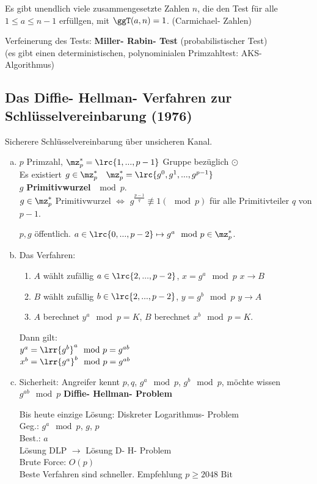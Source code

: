     Es gibt unendlich viele zusammengesetzte Zahlen $n$, die den Test für alle
    $1\leq a\leq n-1$ erfüllgen, mit $\ggT(a,n)=1$. (Carmichael- Zahlen)

    Verfeinerung des Tests: \textbf{Miller- Rabin- Test} (probabilistischer
    Test)\\
    (es gibt einen deterministischen, polynominialen Primzahltest: AKS-
    Algorithmus)

  \subsection{Das Diffie- Hellman- Verfahren zur Schlüsselvereinbarung (1976)}
    Sicherere Schlüsselvereinbarung über unsicheren Kanal.
    \begin{enumerate}[a)]
      \item $p$ Primzahl, $\mz_p^*=\lrc{1,...,p-1}$ Gruppe bezüglich $\odot$\\
        Es existiert $g\in\mz_p^*\quad \mz_p^*=\lrc{g^0,g^1,...,g^{p-1}}$\\
        $g$ \textbf{Primitivwurzel} $\mod p$.\\
        $g\in\mz_p^*$ Primitivwurzel $\Leftrightarrow$
        $g^{\frac{p-1}{q}}\not\equiv 1(\mod p)$ für alle Primitivteiler $q$ von
        $p-1$.

        $p,g$ öffentlich. $a\in\lrc{0,...,p-2}\mapsto g^a\mod p\in\mz_p^*$.
      \item Das Verfahren:
        \begin{enumerate}[1.]
          \item $A$ wählt zufällig $a\in\lrc{2,...,p-2}$, $x=g^a\mod p$
            $x\rightarrow B$
          \item $B$ wählt zufällig $b\in\lrc{2,...,p-2}$, $y=g^b\mod p$
            $y\rightarrow A$
          \item $A$ berechnet $y^a\mod p=K$, $B$ berechnet $x^b\mod p=K$.
        \end{enumerate}

        Dann gilt:\\
        $y^a=\lrr{g^b}^a\mod p=g^{ab}$\\
        $x^b=\lrr{g^a}^b\mod p=g^{ab}$
      \item Sicherheit: Angreifer kennt $p,q$, $g^a\mod p$, $g^b\mod p$, möchte
        wissen $g^{ab}\mod p$ \textbf{Diffie- Hellman- Problem}

        Bis heute einzige Lösung: Diskreter Logarithmus- Problem\\
        Geg.: $g^a\mod p$, $g$, $p$\\
        Best.: $a$\\
        Lösung DLP $\rightarrow$ Lösung D- H- Problem\\
        Brute Force: $O(p)$\\
        Beste Verfahren sind schneller. Empfehlung $p\geq 2048\mbox{ Bit}$
    \end{enumerate}

